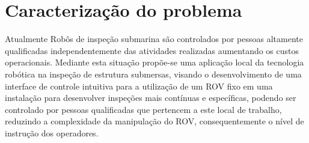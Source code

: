 \chapter{Caracterização do problema}
Atualmente Robôs de inspeção submarina são controlados por pessoas altamente qualificadas independentemente das atividades realizadas aumentando os custos operacionais. Mediante esta situação propõe-se uma aplicação local da tecnologia robótica na inspeção de estrutura submersas, visando o desenvolvimento de uma interface de controle intuitiva para a utilização de um ROV fixo em uma instalação para desenvolver inspeções mais contínuas e específicas, podendo ser controlado por pessoas qualificadas que pertencem a este local de trabalho, reduzindo a complexidade da manipulação do ROV, consequentemente o nível de instrução dos operadores.   

